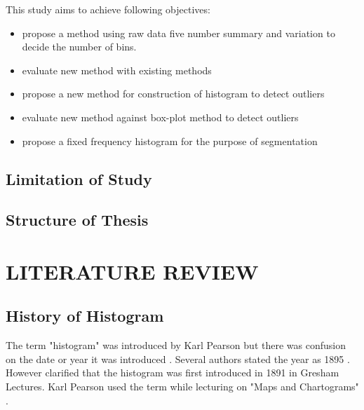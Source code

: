 This study aims to achieve following objectives:

\begin{itemize}
	\item propose a method using raw data five number summary and variation to decide the number of bins.
	\item evaluate new method with existing methods
	\item propose a new method for construction of histogram to detect outliers
	\item evaluate new method against box-plot method to detect outliers
	\item propose a fixed frequency histogram for the purpose of segmentation 

\end{itemize}



\section{Limitation of Study}

\section{Structure of Thesis}


\addblankpage %

\chapter{\textbf{LITERATURE REVIEW}}\label{Introchap} 

\section{History of Histogram}

The term "histogram" was introduced by Karl Pearson \cite[]{ross2010introductory, rufilanchas2017origin} but there was confusion on the date or year it was introduced \cite[]{rufilanchas2017origin,ioannidis2003history}. Several authors stated the year as 1895 \cite[]{beniger1976history, dodge2008concise,ross2010introductory,li2016essential}. However \cite[]{magnello2014introducing, rufilanchas2017origin} clarified that the histogram was first introduced in 1891 in Gresham Lectures. Karl Pearson used the term while lecturing on "Maps and Chartograms" \cite[]{rufilanchas2017origin}.

